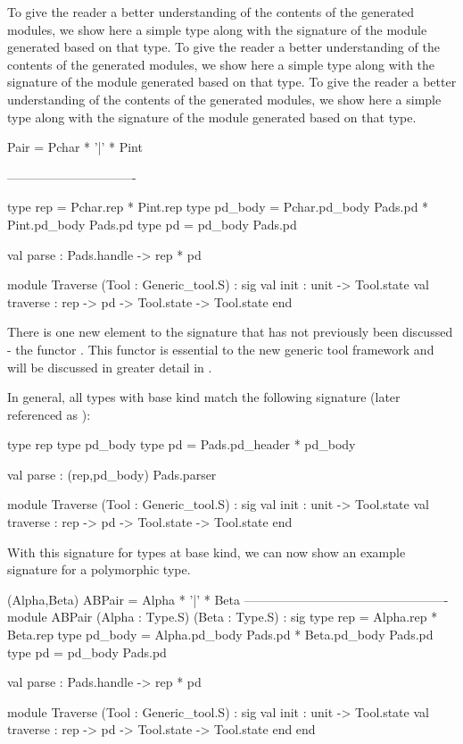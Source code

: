 To give the reader a better understanding of the contents of the
generated modules, we show here a simple \padsml{} type along with the
signature of the module generated based on that type.
To give the reader a better understanding of the contents of the
generated modules, we show here a simple \padsml{} type along with the
signature of the module generated based on that type.
To give the reader a better understanding of the contents of the
generated modules, we show here a simple \padsml{} type along with the
signature of the module generated based on that type.
\begin{code}\scriptsize
{} Pair = Pchar * '|' * Pint

-------------------------------

type rep = Pchar.rep * Pint.rep
type pd_body = Pchar.pd_body Pads.pd * 
                  Pint.pd_body Pads.pd
type pd = pd_body Pads.pd

val parse : Pads.handle -> rep * pd

module Traverse (Tool : Generic_tool.S) :
sig
  val init : unit -> Tool.state
  val traverse : rep -> pd -> Tool.state -> Tool.state
end\end{code}
There is one new element to the signature that has not previously been
discussed - the functor . This functor is essential to
the new generic tool framework and will be discussed in greater detail
in .

In general, all types with base kind match the following signature
(later referenced as ):
\begin{code}\scriptsize
type rep
type pd\_body
type pd = Pads.pd_header * pd_body

val parse : (rep,pd\_body) Pads.parser

module Traverse (Tool : Generic\_tool.S) :
sig
  val init : unit -> Tool.state
  val traverse : rep -> pd -> Tool.state -> Tool.state
end\end{code}
With this signature for types at base kind, we can now show an example
signature for a polymorphic type.
\begin{code}\scriptsize
{} (Alpha,Beta) ABPair = Alpha * '|' * Beta
\mbox{}
-------------------------------------------------
\mbox{}
module ABPair (Alpha : Type.S) (Beta : Type.S) :
sig
  type rep = Alpha.rep * Beta.rep
  type pd\_body = Alpha.pd\_body Pads.pd * 
                     Beta.pd\_body Pads.pd
  type pd = pd\_body Pads.pd

  val parse : Pads.handle -> rep * pd

  module Traverse (Tool : Generic\_tool.S) :
  sig
    val init : unit -> Tool.state
    val traverse : rep -> pd -> Tool.state -> Tool.state
  end
end\end{code}

